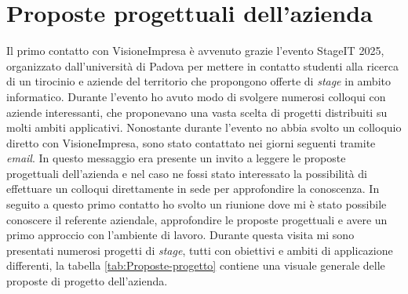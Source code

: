 \section{Proposte progettuali dell'azienda}
Il primo contatto con VisioneImpresa è avvenuto grazie l'evento StageIT 2025, organizzato dall'università di Padova per mettere in contatto studenti alla ricerca di un tirocinio e aziende del territorio che propongono offerte di \textit{stage} in ambito informatico. 
Durante l'evento ho avuto modo di svolgere numerosi colloqui con aziende interessanti, che proponevano una vasta scelta di progetti distribuiti su molti ambiti applicativi.
Nonostante durante l'evento no abbia svolto un colloquio diretto con VisioneImpresa, sono stato contattato nei giorni seguenti tramite \textit{email}. In questo messaggio era presente un invito a leggere le proposte progettuali dell'azienda e nel caso ne fossi stato interessato la possibilità di effettuare un colloqui direttamente in sede per approfondire la conoscenza.
In seguito a questo primo contatto ho svolto un riunione dove mi è stato possibile conoscere il referente aziendale, approfondire le proposte progettuali e avere un primo approccio con l'ambiente di lavoro. Durante questa visita mi sono presentati numerosi progetti di \textit{stage}, tutti con obiettivi e ambiti di applicazione differenti, la tabella  \ref{tab:Proposte-progetto} contiene una visuale generale delle proposte di progetto dell'azienda.


